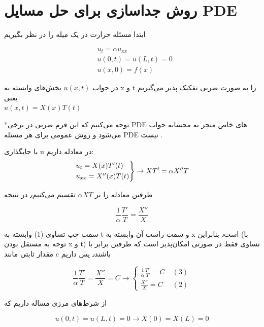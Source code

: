 \section{روش جداسازی برای حل مسایل PDE}
\begin{problem}

	ابتدا مسئله حرارت در یک میله را در نظر بگیریم
	
\begin{align*}
	&u_t = \alpha u_{xx}
	\\
	&u(0,t) = u(L,t) = 0
	\\
	&u(x,0) = f(x)
\end{align*}

در جواب 
$u(x,t)$
بخش‌های وابسته به
x
و
t 
را به صورت ضربی تفکیک‌‌‌ پذیر می‌گیریم یعنی 
\\
$u(x,t) = X(x) T(t)$


*توجه می‌کنیم که این فرم ضربی در برخی 
PDE
های خاص منجر به محسابه جواب می‌شود و روش عمومی برای هر مسئله 
PDE
نیست
.

با جایگذاری u در معادله داریم:
\[
\begin{rcases}
u_t = X(x) T'(t) \\
u_{xx} = X''(x)T(t) \\	
\end{rcases}
\rightarrow XT' = \alpha X'' T
\]


طرفین معادله را بر 
$\alpha XT$
تقسیم می‌کنیم٫ در نتیجه

\begin{equation*}
	\frac{1}{\alpha} \frac{T'}{T} = \frac{X''}{X} \label{eq:1}
\end{equation*}

سمت چپ تساوی
 (1)
 وابسته به 
 t 
 و سمت راست آن وابسته به 
 x 
 است٫ بنابراین (با توجه به مستقل بودن x و t) تساوی فقط در صورتی امکان‌پذیر است که 
 طرفین برابر با مقدار ثابتی مانند c
 باشند٫ پس داریم
 
\begin{equation}
	\frac{1}{\alpha} \frac{T'}{T} = \frac{X''}{X} = C \rightarrow 
	\begin{cases}
		\frac{1}{\alpha}\frac{T'}{T} = C \;&(3)\\
		\frac{X''}{X} = C \;&(2)
	\end{cases}
\end{equation}

از شرط‌های مرزی مساله داریم که 

\begin{equation}
	u(0,t) = u(L,t) = 0 \rightarrow
	X(0) = X(L) = 0
\end{equation}


\end{problem}
